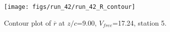 \begin{figure}[H]
\centering
\texttt{[image: figs/run\_42/run\_42\_R\_contour]}
\caption{Contour plot of $\overline{r}$ at $z/c$=9.00, $V_{free}$=17.24, station 5.}
\label{fig:run_42_R_contour}
\end{figure}


